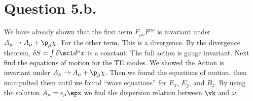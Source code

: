 \documentclass{article}
\begin{document}
\section*{Question 5.b.}
We have already shown that the first term $F_{\mu\nu}F^{\mu\nu}$ is invariant under $A_\mu\rightarrow A_\mu + \p_\mu \chi$. For the other term,
This is a divergence. By the divergence theorem, $\delta S=\int \delta \scl d^nx$ is a constant. The full action is gauge invariant. Next find the equations of motion for the TE modes.
\e{\epsilon^{\mu\nu\rho}\epsilon_{\mu\alpha\beta}=\delta^{\nu}_{\alpha} \delta^{\rho}_{\beta}- \delta^{\nu}_{\beta} \delta^{\rho}_{\alpha}}
We showed the Action is invariant under $A_\mu\rightarrow A_\mu+\p_\mu\chi$. Then we found the equations of motion, then manipulted them until we found ``wave equations'' for $E_x$, $E_y$, and $B_z$. By using the solution $A_\mu=\epsilon_\mu \epx$ we find the dispersion relation between $\vk$ and $\omega$.
\end{document}
